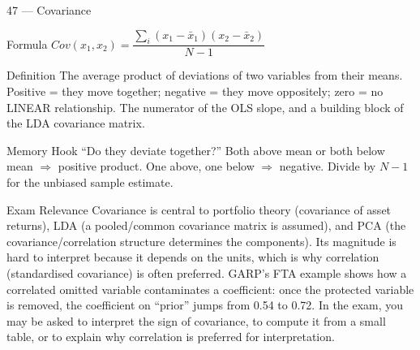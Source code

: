 \documentclass[aspectratio=169,8pt]{beamer}
\begin{document}
	\begin{frame}{47 --- Covariance}
		\begin{block}{Formula}
			$Cov(x_1, x_2) = \dfrac{\sum_i (x_1 - \bar{x}_1)(x_2 - \bar{x}_2)}{N - 1}$
		\end{block}
		\begin{block}{Definition}
			The average product of deviations of two variables from their means. Positive = they move together; negative = they move oppositely; zero = no LINEAR relationship. The numerator of the OLS slope, and a building block of the LDA covariance matrix.
		\end{block}
		\begin{block}{Memory Hook}
			``Do they deviate together?'' Both above mean or both below mean $\Rightarrow$ positive product. One above, one below $\Rightarrow$ negative. Divide by $N - 1$ for the unbiased sample estimate.
		\end{block}
		\begin{block}{Exam Relevance}
			Covariance is central to portfolio theory (covariance of asset returns), LDA (a pooled/common covariance matrix is assumed), and PCA (the covariance/correlation structure determines the components). Its magnitude is hard to interpret because it depends on the units, which is why correlation (standardised covariance) is often preferred. GARP's FTA example shows how a correlated omitted variable contaminates a coefficient: once the protected variable is removed, the coefficient on ``prior'' jumps from 0.54 to 0.72. In the exam, you may be asked to interpret the sign of covariance, to compute it from a small table, or to explain why correlation is preferred for interpretation.
		\end{block}
	\end{frame}
	
\end{document}
